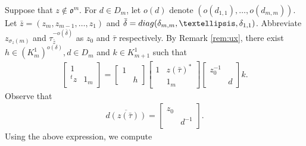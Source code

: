 \documentclass[11pt]{amsart}
\newcommand\s{\sigma}%
\newcommand\oo{\mathfrak{o}}
\newcommand\1{\mathbf{1}}
\newcommand\diag{{\rm diag}}
\numberwithin{equation}{section}
\begin{document}
Suppose that $z \not\in \oo^m$.
For $d \in D_m$, let $o(d)$ denote $(o(d_{1,1}), \ldots, o(d_{m,m}))$.
Let $\bar{z} = (z_m,z_{m-1}, \ldots, z_1)$ and $\bar{\delta} = \diag(\delta_{m,m}, \ldots, \delta_{1,1})$.
Abbreviate $z_{\s_z(m)}$ and $\tau_{\bar{z}}^{-o(\bar{\delta})}$ as $z_0$ and $\bar{\tau}$ respectively.
By Remark \ref{rem:ux}, there exist $h \in (K_m^1)^{o(\delta)}, d \in D_m$ and $k \in K_{m+1}^1$ such that 
\begin{align*}
\begin{bmatrix}
1&  \\
{}^tz & 1_m
\end{bmatrix} = \begin{bmatrix}
1&  \\
& h
\end{bmatrix}
\begin{bmatrix}
1 & z(\bar{\tau})^*  \\
&1_m
\end{bmatrix}
\begin{bmatrix}
z_{0}^{-1} &  \\
& d
\end{bmatrix}k.
\end{align*} 
Observe that 
\begin{align}
\overline{d(z(\bar{\tau}))} = 
\begin{bmatrix}
z_{0} &  \\
& d^{-1}
\end{bmatrix}.  \label{def:d}
\end{align} 
Using the above expression, we compute 
\end{document}
